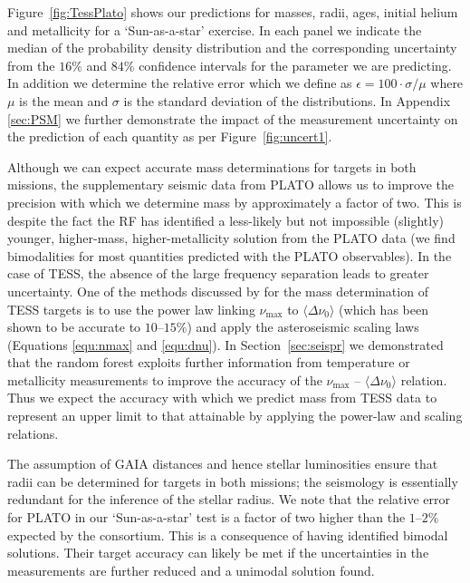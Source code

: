 Figure~\ref{fig:TessPlato} shows our predictions for masses, radii, ages, initial helium and metallicity for a `Sun-as-a-star' exercise. In each panel we indicate the median of the probability density distribution and the corresponding  uncertainty from the $16\%$ and $84\%$ confidence intervals for the parameter we are predicting. In addition we determine the relative error which we define as ${\epsilon = 100 \cdot \sigma/\mu}$  where $\mu$ is the mean and $\sigma$ is the standard deviation of the distributions. In Appendix \ref{sec:PSM} we further demonstrate the impact of the measurement uncertainty on the prediction of each quantity as per Figure~\ref{fig:uncert1}.


Although we can expect accurate mass determinations for targets in both missions, the supplementary seismic data from PLATO allows us to improve the precision with which we determine mass by approximately a factor of two. This is despite the fact the RF has identified a less-likely but not impossible (slightly) younger, higher-mass, higher-metallicity solution from the  PLATO  data (we find bimodalities for most quantities predicted with the PLATO observables). In the case of TESS, the absence of the large frequency separation leads to greater uncertainty. One of the methods discussed  by \citet{2016ApJ...830..138C} for the mass determination of TESS targets is to use the power law linking $\nu_{\max}$ to ${\langle\Delta\nu_0\rangle}$ (which has been shown to be accurate to $10$--$15\%$) and apply the asteroseismic scaling laws (Equations \ref{equ:nmax} and \ref{equ:dnu}).  In Section~\ref{sec:seispr} we demonstrated that the random forest exploits further information from  temperature or metallicity measurements to improve the accuracy of the $\nu_{\max}$ -- ${\langle\Delta\nu_0\rangle}$ relation.  Thus we expect the accuracy with which we predict mass from TESS data to represent an upper limit to that attainable by  applying the power-law and scaling relations. 

The assumption of GAIA distances and hence stellar luminosities ensure that radii can be determined for targets in both missions; the seismology is essentially redundant for the inference of the stellar radius.  We note that the relative error for  PLATO in our `Sun-as-a-star' test  is a factor of two higher than the $1$--$2\%$ expected by the consortium. This is a consequence of having identified bimodal solutions. Their target accuracy can likely be met if the uncertainties in the measurements are further reduced and a unimodal solution found. 

